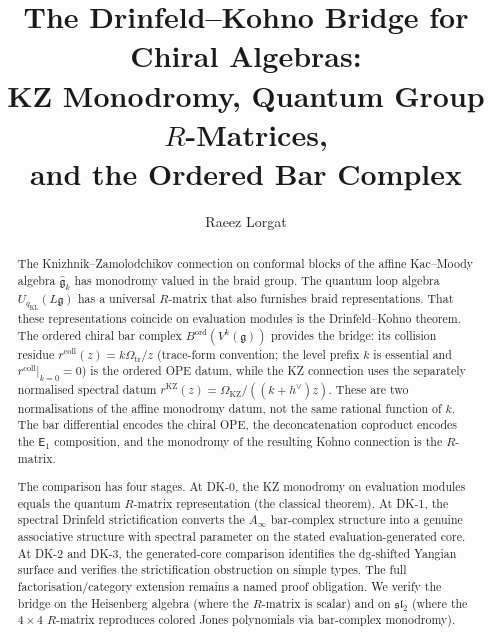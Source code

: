\documentclass[11pt,reqno]{amsart}
\theoremstyle{definition}
\theoremstyle{remark}
\newcommand{\Ainf}{A_{\infty}}
\newcommand{\Eone}{\mathsf{E}_{1}}
\newcommand{\fg}{\mathfrak{g}}
\numberwithin{equation}{section}
\begin{document}
\title[The Drinfeld--Kohno Bridge]{The Drinfeld--Kohno Bridge for Chiral Algebras:\\
KZ Monodromy, Quantum Group $R$-Matrices,\\
and the Ordered Bar Complex}

\author{Raeez Lorgat}
\address{Perimeter Institute for Theoretical Physics,
  Waterloo, ON N2L 2Y5, Canada \\
  Department of Physics, University of Waterloo,
  Waterloo, ON N2L 3G1, Canada}

\date{}

\begin{abstract}
The Knizhnik--Zamolodchikov connection on conformal blocks
of the affine Kac--Moody algebra $\widehat{\fg}_k$ has
monodromy valued in the braid group.  The quantum loop algebra
$U_{q_{\mathrm{KL}}}(L\fg)$ has a universal $R$-matrix that also furnishes
braid representations.  That these representations coincide
on evaluation modules is the Drinfeld--Kohno theorem.  The ordered
chiral bar complex $B^{\mathrm{ord}}(V^k(\fg))$ provides the bridge:
its collision residue
$r^{\mathrm{coll}}(z) = k\Omega_{\mathrm{tr}}/z$ (trace-form
convention; the level prefix $k$ is essential and
$r^{\mathrm{coll}}|_{k=0} = 0$) is the ordered OPE datum, while the
KZ connection uses the separately normalised spectral datum
$r^{\mathrm{KZ}}(z)=\Omega_{\mathrm{KZ}}/((k+h^\vee)z)$.  These are
two normalisations of the affine monodromy datum, not the same
rational function of $k$.  The bar differential encodes the chiral
OPE, the deconcatenation coproduct encodes the $\Eone$
composition, and the monodromy of the resulting Kohno
connection is the $R$-matrix.

The comparison has four stages.
At DK-0, the KZ monodromy on evaluation modules equals the
quantum $R$-matrix representation (the classical theorem).
At DK-1, the spectral Drinfeld strictification converts
the $\Ainf$ bar-complex structure into a genuine
associative structure with spectral parameter on the stated
evaluation-generated core.  At DK-2 and DK-3, the generated-core
comparison identifies the dg-shifted Yangian surface and verifies the
strictification obstruction on simple types.  The full
factorisation/category extension remains a named proof obligation.
We verify the bridge on the Heisenberg algebra (where the
$R$-matrix is scalar) and on $\mathfrak{sl}_2$ (where
the $4 \times 4$ $R$-matrix reproduces colored Jones
polynomials via bar-complex monodromy).
\end{abstract}
\end{document}
